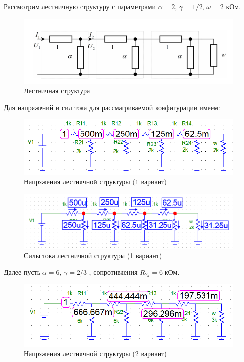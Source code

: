 \documentclass[a4paper, 12pt]{article} %
\begin{document}
Рассмотрим лестничную структуру с параметрами $\alpha = 2$, $\gamma = 1/2$, $\omega = 2$ кОм.

\begin{figure}[h!]
    \centering
    \includegraphics[width = 12 cm]{3.png}
    \caption{Лестничная структура}
    \label{fig:vac}
\end{figure}

Для напряжений и сил тока для рассматриваемой конфигурации имеем:

\begin{figure}[h!]
    \centering
    \includegraphics[width = 12 cm]{4.png}
    \caption{Напряжения лестничной структуры (1 вариант)}
    \label{fig:vac}
\end{figure}

\begin{figure}[h!]
    \centering
    \includegraphics[width = 12 cm]{5.png}
    \caption{Силы тока лестничной структуры (1 вариант)}
    \label{fig:vac}
\end{figure}

Далее пусть $\alpha = 6$, $\gamma = 2/3$ , сопротивления $R_{2j} = 6$ кОм.

\begin{figure}[h!]
    \centering
    \includegraphics[width = 12 cm]{6.png}
    \caption{Напряжения лестничной структуры (2 вариант)}
    \label{fig:vac}
\end{figure}
\end{document}
